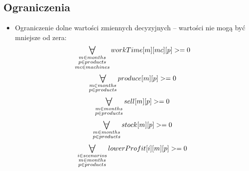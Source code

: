 \documentclass[11pt,a4paper]{article}
\newcommand\bigforall{%
  \mathop{\lower0.75ex\hbox{\ensuremath{%
    \mathlarger{\mathlarger{\mathlarger{\mathlarger{\forall}}}}}}}%
  \limits}
\begin{document}
\subsection{Ograniczenia}
\begin{itemize}
\item Ograniczenie dolne wartości zmiennych decyzyjnych – wartości nie mogą być mniejsze od zera:
	\begin{equation}
	\bigforall_{\substack{
			m \in months \\ 
			p \in products \\
			mc \in machines}} workTime[m][mc][p] >=0
	\end{equation}
	\begin{equation}
	\bigforall_{\substack{
			m \in months \\ 
			p \in products}} produce[m][p] >=0
	\end{equation}
	\begin{equation}
	\bigforall_{\substack{
			m \in months \\ 
			p \in products}} sell[m][p] >=0
	\end{equation}
	\begin{equation}
	\bigforall_{\substack{
			m \in months \\ 
			p \in products}} stock[m][p] >=0
	\end{equation}
	\begin{equation}
	\bigforall_{\substack{
			i \in scenarios \\
			m \in months \\ 
			p \in products}} lowerProfit[i][m][p] >=0
	\end{equation}


\end{itemize}
\end{document}
